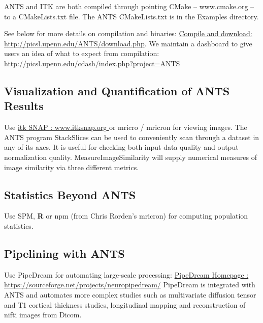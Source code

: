 \documentclass{InsightArticle}
\begin{document}
ANTS and ITK are both compiled through pointing CMake -- www.cmake.org
-- to a CMakeLists.txt file.  The ANTS CMakeLists.txt is in the
Examples directory.  

See below for more details on compilation and binaries: \newline
\href{http://picsl.upenn.edu/ANTS/download.php}{Compile and download: http://picsl.upenn.edu/ANTS/download.php}.
We maintain a dashboard to give users an idea of what to expect 
from compilation:\newline
\href{http://picsl.upenn.edu/cdash/index.php?project=ANTS}{http://picsl.upenn.edu/cdash/index.php?project=ANTS}


\subsection{Visualization and Quantification of ANTS Results}
Use \href{www.itksnap.org}{itk SNAP : www.itksnap.org } or mricro / mricron for viewing
images.  The ANTS program StackSlices can be used to conveniently scan
through a dataset in any of its axes.  It is useful for checking both
input data quality and output normalization quality.  MeasureImageSimilarity 
will supply numerical measures of image similarity via three different metrics. 

\subsection{Statistics Beyond ANTS}
Use SPM, {\bf R} or npm (from Chris Rorden's mricron) for computing population statistics.

\subsection{Pipelining with ANTS}
Use PipeDream for automating large-scale processing:\newline
\href{https://sourceforge.net/projects/neuropipedream/}{PipeDream
  Homepage :
  https://sourceforge.net/projects/neuropipedream/} \newline PipeDream
is integrated with ANTS and automates more complex studies such as
multivariate diffusion tensor and T1 cortical thickness studies,
longitudinal mapping and reconstruction of nifti images from Dicom.
\newpage
\end{document}
